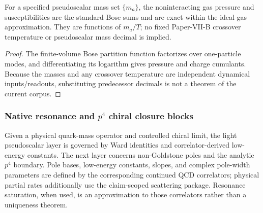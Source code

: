 \documentclass[12pt,a4paper]{article}
\begin{document}
\begin{corollary}
\label{p11:cor:native-pseudoscalar-gas-fingerprint}

For a specified pseudoscalar mass set \(\{m_a\}\), the noninteracting gas pressure and susceptibilities are the standard Bose sums and are exact within the ideal-gas approximation.  They are functions of \(m_a/T\); no fixed Paper-VII-B crossover temperature or pseudoscalar mass decimal is implied.
\label{p11:eq:ps-gas-pressure-fingerprint}
\label{p11:eq:ps-gas-energy-fingerprint}
\label{p11:eq:ps-gas-susceptibility-fingerprint}
\label{p11:eq:ps-gas-eos-numerical-fingerprint}
\label{p11:eq:ps-gas-bqs-numerical-fingerprint}
\label{p11:eq:ps-gas-fourth-cumulant-numerical-fingerprint}
\end{corollary}
\begin{proof}

The finite-volume Bose partition function factorizes over one-particle modes, and differentiating its logarithm gives pressure and charge cumulants.  Because the masses and any crossover temperature are independent dynamical inputs/readouts, substituting predecessor decimals is not a theorem of the current corpus.
\end{proof}



\subsubsection{Native resonance and \texorpdfstring{$p^4$}{p4} chiral closure blocks}
\label{p11:subsec:native-resonance-p7-closures}

Given a physical quark-mass operator and controlled chiral limit, the light
pseudoscalar layer is governed by Ward identities and correlator-derived
low-energy constants.  The next layer concerns non-Goldstone poles and the
analytic \(p^4\) boundary.  Pole bases, low-energy constants, slopes, and
complex pole-width parameters are defined by the corresponding continued QCD
correlators; physical partial rates additionally use the claim-scoped
scattering package.  Resonance saturation, when used, is an approximation to
those correlators rather than a uniqueness theorem.
\end{document}
